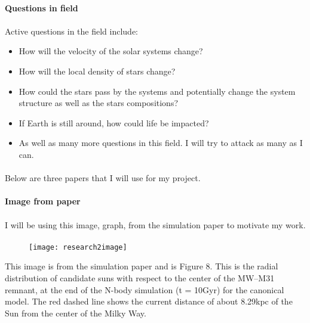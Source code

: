 \documentclass{report}
\begin{document}
\paragraph{Questions in field}
\paragraph{}
Active questions in the field include:
\begin{itemize}
  \item How will the velocity of the solar systems change?
  \item How will the local density of stars change? 
  \item How could the stars pass by the systems and potentially change the system structure as well as the stars compositions?
  \item If Earth is still around, how could life be impacted?
  \item As well as many more questions in this field. I will try to attack as many as I can.
\end{itemize}

\paragraph{}
Below are three papers that I will use for my project. 

\nocite{*}



\paragraph{Image from paper}
\paragraph{}
I will be using this image, graph, from the simulation paper to motivate my work. 
\paragraph{}
\begin{figure}[h]
\graphicspath{ {/home/} }
\texttt{[image: research2image]}
\end{figure}

This image is from the simulation paper and is Figure 8.
This is the radial distribution of candidate suns with respect to the center of the MW–M31 remnant, at the end of the N-body simulation (t = 10Gyr) for the canonical model. The red dashed line shows the current distance of about 8.29kpc of the Sun from the center of the Milky Way.
\end{document}
